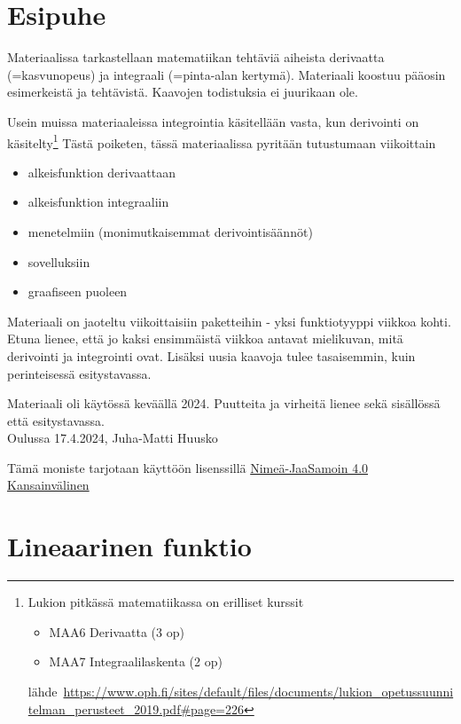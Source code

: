 \documentclass[10pt]{article}
\begin{document}
\section*{Esipuhe}

Materiaalissa tarkastellaan matematiikan tehtäviä aiheista derivaatta (=kasvunopeus) ja integraali (=pinta-alan kertymä). Materiaali koostuu pääosin esimerkeistä ja tehtävistä. Kaavojen todistuksia ei juurikaan ole.

Usein muissa materiaaleissa integrointia käsitellään vasta, kun derivointi on käsitelty\footnote{Lukion pitkässä matematiikassa on erilliset kurssit
\begin{itemize}
\item MAA6 Derivaatta (3 op)
\item MAA7 Integraalilaskenta (2 op)
\end{itemize}
lähde~\url{https://www.oph.fi/sites/default/files/documents/lukion\_opetussuunnitelman\_perusteet\_2019.pdf\#page=226}
}
Tästä poiketen, tässä materiaalissa pyritään tutustumaan viikoittain
\begin{itemize}
\setlength\itemsep{-0.5em}
\item alkeisfunktion derivaattaan
\item alkeisfunktion integraaliin
\item menetelmiin (monimutkaisemmat derivointisäännöt)
\item sovelluksiin
\item graafiseen puoleen
\end{itemize}
Materiaali on jaoteltu viikoittaisiin paketteihin - yksi funktiotyyppi viikkoa kohti. Etuna lienee, että jo kaksi ensimmäistä viikkoa antavat mielikuvan, mitä derivointi ja integrointi ovat. Lisäksi uusia kaavoja tulee tasaisemmin, kuin perinteisessä esitystavassa.

Materiaali oli käytössä keväällä 2024. Puutteita ja virheitä lienee sekä sisällössä että esitystavassa.\\

\noindent Oulussa 17.4.2024, Juha-Matti Huusko
\vspace{10mm}

Tämä moniste tarjotaan käyttöön lisenssillä \href{https://creativecommons.org/licenses/by-sa/4.0/legalcode.fi}{Nimeä-JaaSamoin 4.0 Kansainvälinen}

\tableofcontents

\newpage

\section{Lineaarinen funktio}
\end{document}
